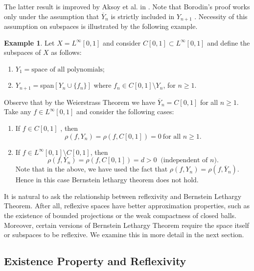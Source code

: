 \documentclass[12pt, reqno]{amsart}
\theoremstyle{definition}
\newtheorem{example}[theorem]{Example}
\theoremstyle{remark}
\numberwithin{equation}{section}
\begin{document}
     The latter result is improved by Aksoy et al. in  \cite{Aksoy}. Note that Borodin's proof works only under the assumption that $\overline{Y}_n$ is strictly included  in $Y_{n+1}$ . Necessity of this assumption on subspaces is illustrated by the following example.
  \begin{example}\label{EXAM}
Let $X = L^{\infty}[0,1]$ and consider $C[0,1] \subset L^{\infty} [0,1]$ and define the subspaces  of $X$ as follows:

\begin{enumerate}
\item $Y_1 =  \mbox{space of all polynomials}$;

\item $Y_{n+1} = $span$[Y_n \cup \{f_{n}\}]$
where $f_{n} \in C[0,1] \setminus Y_n$, for $n\ge1$.
\end{enumerate}
Observe that by the Weierstrass Theorem we have $\overline {Y}_n = C[0,1] $ for all $n \ge1$.
Take any  $ f \in L^{\infty}[0,1]$ and consider the following cases:
\begin{enumerate}
\renewcommand{\labelenumi}{\alph{enumi})}
\item If  $ f \in C[0,1]$ , then
$$
\rho (f,Y_n) = \rho(f,C[0,1]) = 0~\mbox{for all $n\ge1$}.
$$
\item If $ f \in L^{\infty}[0,1] \setminus C[0,1] $, then
$$
\rho(f, Y_n) = \rho(f, C[0,1]) = d > 0~ \mbox{ (independent of $n$)}.
$$
Note that in the above, we have used the fact that $\rho(f,Y_n) = \rho(f,\overline{Y}_n)$.
Hence in this case Bernstein lethargy theorem does not hold.
\end{enumerate}
\end{example}
  
    
      It is natural to ask the relationship between reflexivity and Bernstein Lethargy Theorem. After all, reflexive spaces have better approximation properties, such as the existence of bounded projections or the weak compactness of closed balls. Moreover, certain versions of Bernstein Lethargy Theorem require the space itself or subspaces to be reflexive. We examine this in more detail in the next section.

\subsection{Existence Property and Reflexivity}
\end{document}
